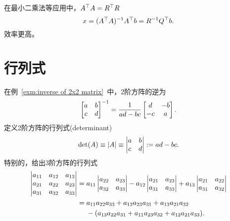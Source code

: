 在最小二乘法等应用中，$A^\top A=R^\top R$
\[
	x=(A^\top A)^{-1} A^\top b=R^{-1} Q^\top b.
\]
效率更高。
\clearpage
\section{行列式}
在例~\ref{exm:inverse of 2x2 matrix}~中，2阶方阵的逆为
\begin{align*}
	\begin{bmatrix}
		a&b\\c&d
	\end{bmatrix}^{-1}=\frac1{ad-bc}
	\begin{bmatrix}
		d&-b\\
		-c&a
	\end{bmatrix}.
\end{align*}
定义2阶方阵的行列式(determinant)
\begin{align}
	\det (A)\equiv\left\lvert A\right\rvert\equiv\begin{vmatrix}
		a&b\\c&d
	\end{vmatrix}:=ad-bc.
\end{align}
特别的，给出3阶方阵的行列式
\begin{align}
	\begin{vmatrix}
		a_{11}&a_{12}&a_{13}\\
		a_{21}&a_{22}&a_{23}\\
		a_{31}&a_{32}&a_{33}
	\end{vmatrix}={}&a_{11}
	\begin{vmatrix}
		a_{22}&a_{23}\\
		a_{32}&a_{33}
	\end{vmatrix}-a_{12}
	\begin{vmatrix}
		a_{21}&a_{23}\\
		a_{31}&a_{33}
	\end{vmatrix}+a_{13}
	\begin{vmatrix}
		a_{21}&a_{22}\\
		a_{31}&a_{32}
	\end{vmatrix}\\\notag
	={}&a_{11}a_{22}a_{33}+a_{12}a_{23}a_{31}+a_{13}a_{21}a_{32}\\\notag
	&-(a_{13}a_{22}a_{31}+a_{11}a_{23}a_{32}+a_{12}a_{21}a_{33}).
\end{align}
